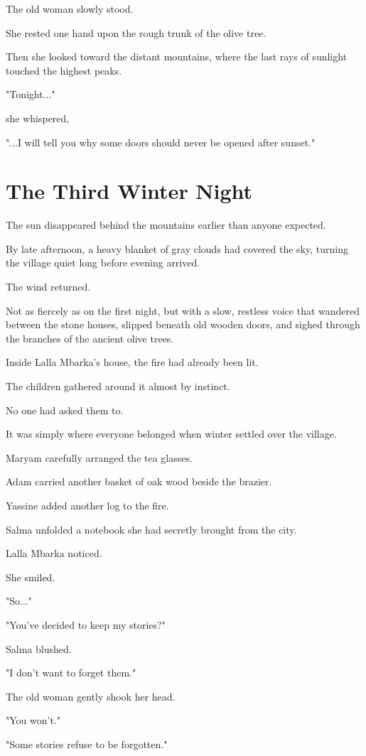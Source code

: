 \documentclass[12pt,openany]{book}
\begin{document}
The old woman slowly stood.

She rested one hand upon the rough trunk of the olive tree.

Then she looked toward the distant mountains, where the last rays of sunlight touched the highest peaks.

"Tonight..."

she whispered,

"...I will tell you why some doors should never be opened after sunset."
\chapter{The Third Winter Night}

The sun disappeared behind the mountains earlier than anyone expected.

By late afternoon, a heavy blanket of gray clouds had covered the sky, turning the village quiet long before evening arrived.

The wind returned.

Not as fiercely as on the first night, but with a slow, restless voice that wandered between the stone houses, slipped beneath old wooden doors, and sighed through the branches of the ancient olive trees.

Inside Lalla Mbarka's house, the fire had already been lit.

The children gathered around it almost by instinct.

No one had asked them to.

It was simply where everyone belonged when winter settled over the village.

Maryam carefully arranged the tea glasses.

Adam carried another basket of oak wood beside the brazier.

Yassine added another log to the fire.

Salma unfolded a notebook she had secretly brought from the city.

Lalla Mbarka noticed.

She smiled.

"So..."

"You've decided to keep my stories?"

Salma blushed.

"I don't want to forget them."

The old woman gently shook her head.

"You won't."

"Some stories refuse to be forgotten."
\end{document}
